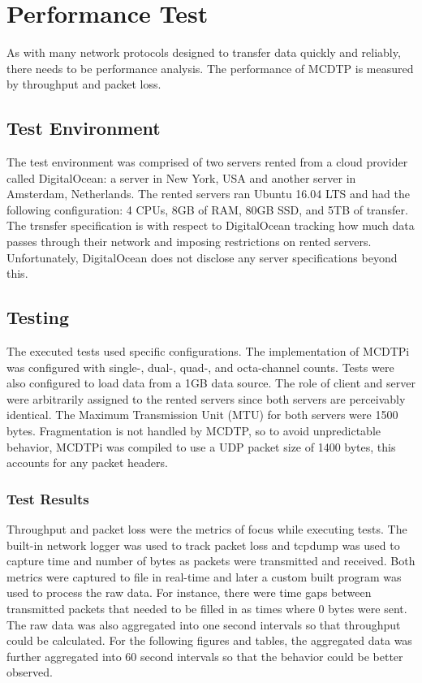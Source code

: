 \chapter{Performance Test}

As with many network protocols designed to transfer data quickly and reliably, there needs to be performance analysis. The performance of MCDTP is measured by throughput and packet loss.

\section{Test Environment}

The test environment was comprised of two servers rented from a cloud provider called DigitalOcean: a server in New York, USA and another server in Amsterdam, Netherlands. The rented servers ran Ubuntu 16.04 LTS and had the following configuration: 4 CPUs, 8GB of RAM, 80GB SSD, and 5TB of transfer. The trsnsfer specification is with respect to DigitalOcean tracking how much data passes through their network and imposing restrictions on rented servers. Unfortunately, DigitalOcean does not disclose any server specifications beyond this.

\section{Testing}

The executed tests used specific configurations. The implementation of MCDTPi was configured with single-, dual-, quad-, and octa-channel counts. Tests were also configured to load data from a 1GB data source. The role of client and server were arbitrarily assigned to the rented servers since both servers are perceivably identical. The Maximum Transmission Unit (MTU) for both servers were 1500 bytes. Fragmentation is not handled by MCDTP, so to avoid unpredictable behavior, MCDTPi was compiled to use a UDP packet size of 1400 bytes, this accounts for any packet headers.

\subsection{Test Results}

Throughput and packet loss were the metrics of focus while executing tests. The built-in network logger was used to track packet loss and tcpdump was used to capture time and number of bytes as packets were transmitted and received. Both metrics were captured to file in real-time and later a custom built program was used to process the raw data. For instance, there were time gaps between transmitted packets that needed to be filled in as times where 0 bytes were sent. The raw data was also aggregated into one second intervals so that throughput could be calculated. For the following figures and tables, the aggregated data was further aggregated into 60 second intervals so that the behavior could be better observed.


